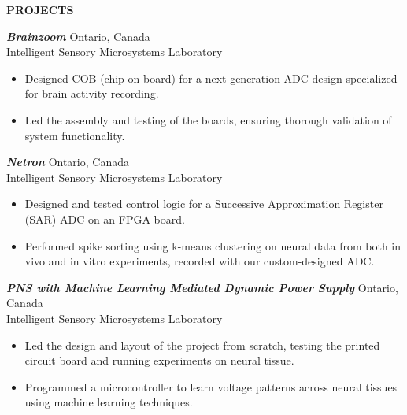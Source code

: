 \documentclass[11pt]{article}
\begin{document}
\vspace{0.15in}


{\noindent \bfseries PROJECTS}
\vspace{0.05in}
\hline

\vspace{0.1in}

\noindent
{\sl \bfseries Brainzoom} \hfill Ontario, Canada \\
\noindent Intelligent Sensory Microsystems Laboratory

\begin{itemize} \itemsep -2pt
	\item Designed COB (chip-on-board) for a next-generation ADC design specialized for brain activity recording.
    \item Led the assembly and testing of the boards, ensuring thorough validation of system functionality.
\end{itemize}

\vspace{0.05in}

\noindent
{\sl \bfseries Netron} \hfill Ontario, Canada \\
\noindent Intelligent Sensory Microsystems Laboratory

\begin{itemize} \itemsep -2pt
	\item Designed and tested control logic for a Successive Approximation Register (SAR) ADC on an FPGA board.
    \item Performed spike sorting using k-means clustering on neural data from both in vivo and in vitro experiments, recorded with our custom-designed ADC.
\end{itemize}

\vspace{0.05in}

\noindent
{\sl \bfseries PNS with Machine Learning Mediated Dynamic Power Supply} \hfill Ontario, Canada \\
\noindent Intelligent Sensory Microsystems Laboratory

\begin{itemize} \itemsep -2pt
	\item Led the design and layout of the project from scratch, testing the printed circuit board and running experiments on neural tissue.
    \item Programmed a microcontroller to learn voltage patterns across neural tissues using machine learning techniques.
\end{itemize}
\end{document}
